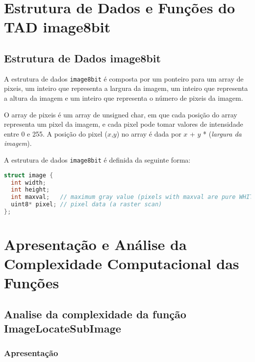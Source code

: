 \documentclass{report}
\begin{document}
\chapter{Estrutura de Dados e Funções do TAD image8bit}

\section{Estrutura de Dados image8bit}

A estrutura de dados \texttt{image8bit} é composta por um ponteiro para um array de pixeis, um inteiro que representa a largura da imagem, um inteiro que representa a altura da imagem e um inteiro que representa o número de pixeis da imagem.
\par
O array de pixeis é um array de unsigned char, em que cada posição do array representa um pixel da imagem, e cada pixel pode tomar valores de intensidade entre 0 e 255. A posição do pixel (\(x\),\(y\)) no array é dada por \(x\) + \(y\) * (\textit{largura da imagem}).
\par
A estrutura de dados \texttt{image8bit} é definida da seguinte forma:

\begin{lstlisting}[language=C]
struct image {
  int width;
  int height;
  int maxval;   // maximum gray value (pixels with maxval are pure WHITE)
  uint8* pixel; // pixel data (a raster scan)
};
\end{lstlisting}




\chapter{Apresentação e Análise da Complexidade Computacional das Funções}

\section{Analise da complexidade da função ImageLocateSubImage}
\subsection{Apresentação}
\end{document}
